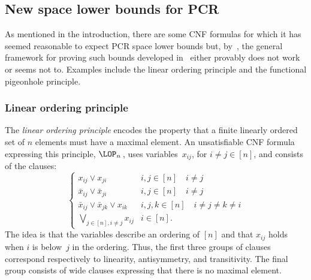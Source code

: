 \documentclass{toc}
\begin{document}
\subsection{New space lower bounds for PCR}


As mentioned in the introduction, there are some CNF formulas for which it has seemed reasonable to expect PCR space lower bounds but, by~\cite{DBLP:conf/icalp/FilmusLMNV13}, the general framework for proving such bounds developed in~\cite{DBLP:journals/jacm/BonacinaG15} either provably does not work or seems not to. Examples include the linear ordering principle and the functional pigeonhole principle.


\subsubsection{Linear ordering principle}
The \emph{linear ordering principle} encodes the property that a finite linearly ordered set of $n$ elements 
must have a maximal element.
An unsatisfiable CNF formula expressing this principle, $\LOP_n$\,, uses variables~$x_{ij}$,
for $i\not =j \in [n]$, and consists of the clauses: 
$$
\left \{
\begin{array}{ll}
 x_{ij} \vee  x_{ji} & i,j\in[n] \quad i \not =j \\
\bar x_{ij} \vee \bar x_{ji} & i,j\in[n] \quad i \not =j \\
\bar x_{ij} \vee \bar x_{jk} \vee x_{ik} &  i,j,k \in [n] \quad i\not = j\not = k \not = i \\
\bigvee_{j\in [n], i\not =j} x_{ij} & i \in [n].
\end{array}
\right.
$$
The idea is that the variables describe an ordering of $[n]$ and that $x_{ij}$ holds when $i$ is 
below~$j$ in the ordering.
Thus, the first three groups of clauses correspond respectively
to linearity, antisymmetry, and transitivity.
The final group consists of wide clauses expressing that there is no maximal element. 
\end{document}
